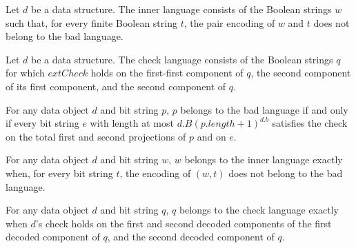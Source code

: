 \begin{definition}
\label{Complexity.Yap.Data.innerLang}
\leanok
{}
Let $d$ be a data structure. The inner language consists of the Boolean strings $w$ such
that, for every finite Boolean string $t$, the pair encoding of $w$ and $t$ does not
belong to the bad language.
\end{definition}

\begin{definition}
\label{Complexity.Yap.Data.checkLang}
\leanok
{}
Let $d$ be a data structure. The check language consists of the Boolean strings $q$ for
which $	ext{Check}$ holds on the first-first component of $q$, the second component of
its first component, and the second component of $q$.
\end{definition}

\begin{theorem}
\label{Complexity.Yap.Data.mem_badLang}
\leanok
{}
For any data object $d$ and bit string $p$, $p$ belongs to the bad language if and only
if every bit string $e$ with length at most $d.B(p.length+1)^{d.b}$ satisfies the check
on the total first and second projections of $p$ and on $e$.
\end{theorem}

\begin{theorem}
\label{Complexity.Yap.Data.mem_innerLang}
\leanok
{}
For any data object $d$ and bit string $w$, $w$ belongs to the inner language exactly
when, for every bit string $t$, the encoding of $(w,t)$ does not belong to the bad
language.
\end{theorem}

\begin{theorem}
\label{Complexity.Yap.Data.mem_checkLang}
\leanok
{}
For any data object $d$ and bit string $q$, $q$ belongs to the check language exactly
when $d$'s check holds on the first and second decoded components of the first decoded
component of $q$, and the second decoded component of $q$.
\end{theorem}

